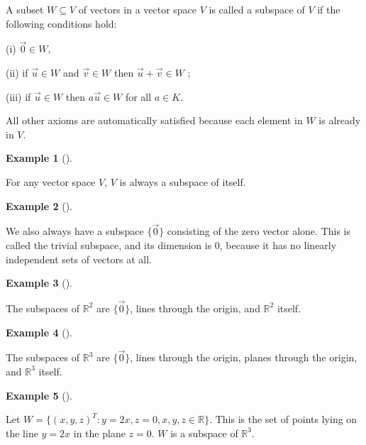 \documentclass[
  a4paper,
  DIV=11,
  numbers=noendperiod,
  oneside]{scrreprt}
\theoremstyle{definition}
\newtheorem{example}{Example}[chapter]
\theoremstyle{remark}
\newenvironment{fbxSimple}[3]{\begin{tcolorbox}[enhanced, breakable,%
attach boxed title to top*={xshift=1.4pt},
boxed title style={boxrule=0.0mm, fuzzy shadow={1pt}{-1pt}{0mm}{0.1mm}{gray}, arc=.3em, rounded corners=east, sharp corners=west}, colframe=#1-color2, colbacktitle=#1-color1, colback = white, coltitle=black,  titlerule=0mm, toprule=0pt, bottomrule=.7pt, leftrule=.3em, rightrule=.7pt, outer arc=.3em,  	left=.5em, right=.5em, bottomtitle=1mm, toptitle=1mm,title=\textbf{#2}\hspace{0.5em}{#3}]}
{\end{tcolorbox}}
\begin{document}
\label{subspace}
\begin{fbxSimple}{Definition}{Definition 2.11: }{Subspace}
\label{subspace}
A subset \(W \subseteq V\) of vectors in a vector space \(V\) is called
a subspace of \(V\) if the following conditions hold:

(i) \({\vec 0}\in W,\)

(ii) if \({\vec u} \in W\) and \({\vec v} \in W\) then \({\vec u}+{\vec
v\in }W\) ;

(iii) if \({\vec u\in }W\) then \(a{\vec u\in }W\) for all \(a\in K\).

\end{fbxSimple}

All other axioms are automatically satisfied because each element in
\(W\) is already in \(V\).

\begin{example}[]\protect\hypertarget{exm-}{}\label{exm-}

For any vector space \(V\), \(V\) is always a subspace of itself.

\end{example}

\begin{example}[]\protect\hypertarget{exm-}{}\label{exm-}

We also always have a subspace \(\{\vec{0}\}\) consisting of the zero
vector alone. This is called the trivial subspace, and its dimension is
\(0\), because it has no linearly independent sets of vectors at all.

\end{example}

\begin{example}[]\protect\hypertarget{exm-}{}\label{exm-}

The subspaces of \(\mathbb{R}^{2}\) are \(\{\vec{0}\}\), lines through
the origin, and \(\mathbb{R}^{2}\) itself.

\end{example}

\begin{example}[]\protect\hypertarget{exm-}{}\label{exm-}

The subspaces of \(\mathbb{R}^{3}\) are \(\{\vec{0}\}\), lines through
the origin, planes through the origin, and \(\mathbb{R}^{3}\) itself.

\end{example}

\begin{example}[]\protect\hypertarget{exm-}{}\label{exm-}

Let \(W=\{(x,y,z)^{T}:y=2x, z=0,x,y,z\in\mathbb{R}\}\). This is the set
of points lying on the line \(y=2x\) in the plane \(z=0\). \(W\) is a
subspace of \(\mathbb{R}^{3}\).

\end{example}
\end{document}
